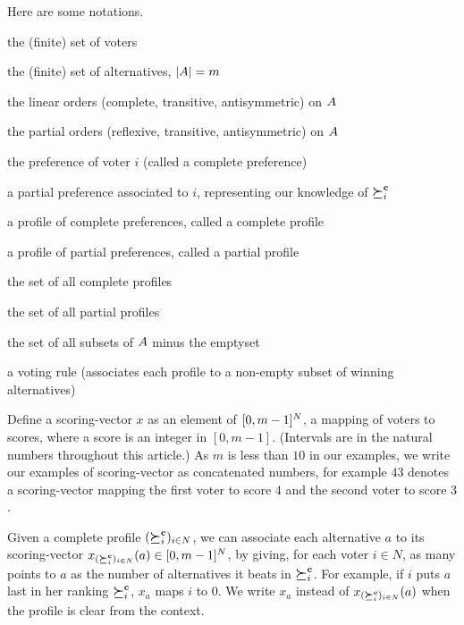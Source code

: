 \documentclass[version=last, pagesize, twoside=off, bibliography=totoc, DIV=calc, fontsize=14pt, a4paper, french, english]{scrartcl}
\begin{document}
Here are some notations.
\begin{description}[font=\normalfont, leftmargin=!, labelwidth=\widthof{The longest label}]
	\item[$N$] the (finite) set of voters
	\item[$\alts$] the (finite) set of alternatives, $\lvert{A}\rvert = m$
	\item[$\linors \subseteq \powerset{\alts × \alts}$] the linear orders (complete, transitive, antisymmetric) on $\alts$
	\item[$\pors \subseteq \powerset{\alts × \alts}$] the partial orders (reflexive, transitive, antisymmetric) on $\alts$
	\item[$\pref_i \in \linors$] the preference of voter $i$ (called a complete preference)
	\item[$\ppref_i \in \pors$] a partial preference associated to $i$, representing our knowledge of $\boldsymbol{\succeq}^\textbf{c}_i$
	\item[$\prof = \profshort$] a profile of complete preferences, called a complete profile
	\item[$\pprof = \pprofshort$] a profile of partial preferences, called a partial profile
	\item[$\allprofs$] the set of all complete profiles
	\item[$\allpprofs$] the set of all partial profiles
	\item[$\powersetz{\alts}$] the set of all subsets of $\alts$ minus the emptyset
	\item[$F: \allprofs \rightarrow \powersetz{\alts}$] a voting rule (associates each profile to a non-empty subset of winning alternatives)
\end{description}

Define a scoring-vector $x$ as an element of $[0, m-1]^N$, a mapping of voters to scores, where a score is an integer in $[0, m-1]$. (Intervals are in the natural numbers throughout this article.) As $m$ is less than $10$ in our examples, we write our examples of scoring-vector as concatenated numbers, for example $43$ denotes a scoring-vector mapping the first voter to score $4$ and the second voter to score $3$.

Given a complete profile $(\boldsymbol{\succeq}^\textbf{c}_i)_{i \in N}$, we can associate each alternative $a$ to its scoring-vector $x_{(\boldsymbol{\succeq}^\textbf{c}_i)_{i \in N}}(a) \in [0, m-1]^N$, by giving, for each voter $i \in N$, as many points to $a$ as the number of alternatives it beats in $\boldsymbol{\succeq}^\textbf{c}_i$. For example, if $i$ puts $a$ last in her ranking $\boldsymbol{\succeq}^\textbf{c}_i$, $x_a$ maps $i$ to $0$. We write $x_a$ instead of $x_{(\boldsymbol{\succeq}^\textbf{c}_i)_{i \in N}}(a)$ when the profile is clear from the context.
\end{document}
